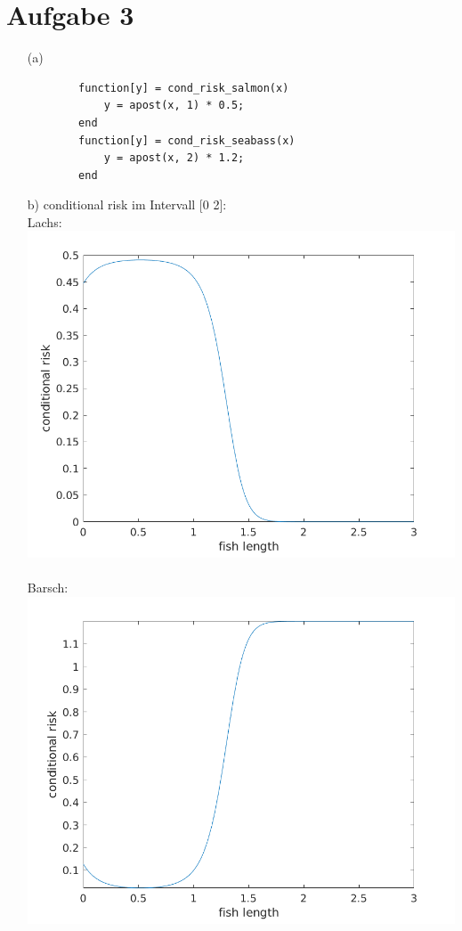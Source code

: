 \documentclass[a4paper]{scrartcl}
\begin{document}
\section*{Aufgabe 3}
\begin{itemize}
	\item[(a)]
	\begin{lstlisting}
		function[y] = cond_risk_salmon(x)
			y = apost(x, 1) * 0.5;
		end
		function[y] = cond_risk_seabass(x)
			y = apost(x, 2) * 1.2;
		end
	\end{lstlisting}
	
	
	\item[b)] conditional risk im Intervall [0 2]:\\
	Lachs:\\
	\includegraphics*[scale = 0.5]{assignment2_data/plots/cond_risk_salmon.png}\\ \ \\
	Barsch:\\
	\includegraphics*[scale = 0.5]{assignment2_data/plots/cond_risk_seabass.png}
	

\end{itemize}
\end{document}
